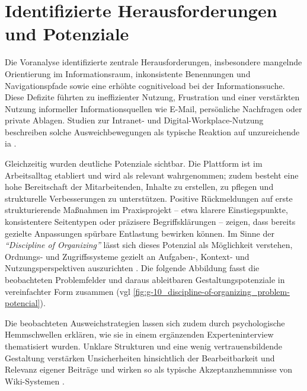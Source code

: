 \section{Identifizierte Herausforderungen und Potenziale}
\label{sec:03-06_challenges-and-opportunities}

Die Voranalyse identifizierte zentrale Herausforderungen, insbesondere mangelnde Orientierung im Informationsraum, inkonsistente Benennungen und Navigationspfade sowie eine erhöhte \gls{cognitiveload} bei der Informationssuche. Diese Defizite führten zu ineffizienter Nutzung, Frustration und einer verstärkten Nutzung informeller Informationsquellen wie E-Mail, persönliche Nachfragen oder private Ablagen. Studien zur Intranet- und Digital-Workplace-Nutzung beschreiben solche Ausweichbewegungen als typische Reaktion auf unzureichende \Gls{ia} \cite{113:NNGIntranetGuidelines,114:IntranetAdoption}.

\newpage

Gleichzeitig wurden deutliche Potenziale sichtbar. Die Plattform ist im Arbeitsalltag etabliert und wird als relevant wahrgenommen; zudem besteht eine hohe Bereitschaft der Mitarbeitenden, Inhalte zu erstellen, zu pflegen und strukturelle Verbesserungen zu unterstützen. Positive Rückmeldungen auf erste strukturierende Maßnahmen im Praxisprojekt -- etwa klarere Einstiegspunkte, konsistentere Seitentypen oder präzisere Begriffsklärungen -- zeigen, dass bereits gezielte Anpassungen spürbare Entlastung bewirken können. Im Sinne der \textit{\enquote{Discipline of Organizing}} lässt sich dieses Potenzial als Möglichkeit verstehen, Ordnungs- und Zugriffssysteme gezielt an Aufgaben-, Kontext- und Nutzungsperspektiven auszurichten \cite{419:Glushko2013}. Die folgende Abbildung fasst die beobachteten Problemfelder und daraus ableitbaren Gestaltungspotenziale in vereinfachter Form zusammen (\acrshort{vgl} \autoref{fig:g-10_discipline-of-organizing_problem-potencial}).


Die beobachteten Ausweichstrategien lassen sich zudem durch psychologische Hemmschwellen erklären, wie sie in einem ergänzenden Experteninterview thematisiert wurden. Unklare Strukturen und eine wenig vertrauensbildende Gestaltung verstärken Unsicherheiten hinsichtlich der Bearbeitbarkeit und Relevanz eigener Beiträge und wirken so als typische Akzeptanzhemmnisse von Wiki-Systemen \cite{907:Riegler2025}.
